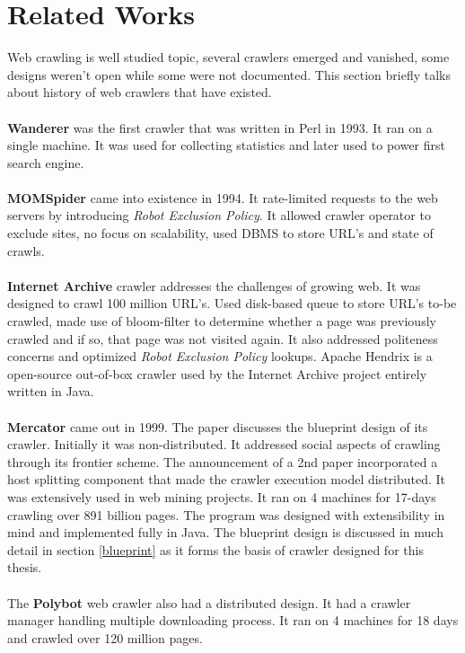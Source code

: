 \section{Related Works}\label{relatedworks}
Web crawling is well studied topic, several crawlers emerged and vanished, some designs weren't open while
some were not documented. This section briefly talks about history of web crawlers that have existed. 
\\
\\
\textbf{Wanderer} \cite{blocks} was the first crawler that was written in Perl in 1993. It ran on a single machine. It was used for collecting statistics and later used to power first search engine. 
\\
\\
\textbf{MOMSpider} \cite{blocks} came into existence in 1994. It rate-limited requests to the web servers by introducing \textit{Robot Exclusion Policy}. It allowed crawler operator to exclude sites, no focus on scalability, used DBMS to store URL's and state of crawls.
\\
\\
\textbf{Internet Archive} \cite{netarchive} crawler addresses the challenges of growing web. It was designed to crawl 100 million URL's. Used disk-based queue to store URL's to-be crawled, made use of bloom-filter to determine whether a page was previously crawled and if so, that page was not visited again. It also addressed politeness concerns and optimized \textit{Robot Exclusion Policy} lookups. Apache Hendrix is a open-source out-of-box crawler used by the Internet Archive project entirely written in Java.
\\
\\
\textbf{Mercator} \cite{mercator} came out in 1999. The paper discusses the blueprint design of its crawler. Initially it was non-distributed. It addressed social aspects of crawling through its frontier scheme. The announcement of a 2nd paper incorporated a host splitting component that made the crawler execution model distributed. It was extensively used in web mining projects. It ran on 4 machines for 17-days crawling over 891 billion pages. The program was designed with extensibility in mind and implemented fully in Java.
The blueprint design is discussed in much detail in section \ref{blueprint} as it forms the basis of
crawler designed for this thesis.
\\
\\
The \textbf{Polybot}\cite{polybot} web crawler also had a distributed design. It had a crawler manager handling multiple downloading process. It ran on 4 machines for 18 days and crawled over 120 million pages.
